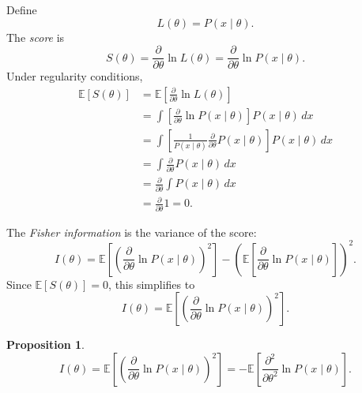 \documentclass[11pt, titlepage]{article} %
\numberwithin{equation}{section}
\newtheorem{proposition}{Proposition}
\theoremstyle{definition}
\numberwithin{assumption}{section}
\begin{document}
Define
\begin{equation*}
    L(\theta)=P(x\mid \theta).
\end{equation*}
The \textit{score} is
\begin{equation*}
    S(\theta)=\frac{\partial}{\partial \theta}\ln L(\theta)
    =\frac{\partial}{\partial \theta}\ln P(x\mid \theta).
\end{equation*}
Under regularity conditions,
\begin{align*}
    \mathbb{E}[S(\theta)]
    &= \mathbb{E}\!\left[\frac{\partial}{\partial \theta}\ln L(\theta)\right]\\
    &= \int \left[\frac{\partial}{\partial \theta}\ln P(x\mid \theta)\right]P(x\mid \theta)\,dx\\
    &= \int \left[\frac{1}{P(x\mid \theta)}\frac{\partial}{\partial \theta}P(x\mid \theta)\right]P(x\mid \theta)\,dx\\
    &= \int \frac{\partial}{\partial \theta}P(x\mid \theta)\,dx\\
    &= \frac{\partial}{\partial \theta}\int P(x\mid \theta)\,dx\\
    &= \frac{\partial}{\partial \theta}1=0.
\end{align*}

The \textit{Fisher information} is the variance of the score:
\begin{equation*}
    I(\theta)=\mathbb{E}\!\left[\left(\frac{\partial}{\partial \theta}\ln P(x\mid \theta)\right)^2\right]
    -\left(\mathbb{E}\!\left[\frac{\partial}{\partial \theta}\ln P(x\mid \theta)\right]\right)^2.
\end{equation*}
Since $\mathbb{E}[S(\theta)]=0$, this simplifies to
\begin{equation*}
    I(\theta)=\mathbb{E}\!\left[\left(\frac{\partial}{\partial \theta}\ln P(x\mid \theta)\right)^2\right].
\end{equation*}

\begin{proposition}
   \begin{equation*}
       I(\theta)=\mathbb{E}\!\left[\left(\frac{\partial}{\partial \theta}\ln P(x\mid \theta)\right)^2\right]=-\mathbb{E}\!\left[\frac{\partial^2}{\partial \theta^2}\ln P(x\mid \theta)\right].
   \end{equation*}
\end{proposition}
\end{document}
